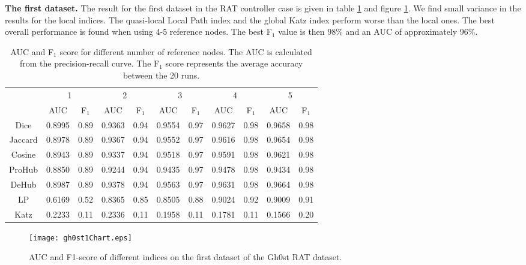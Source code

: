 \textbf{The first dataset.} The result for the first dataset in the RAT controller case is given in table \ref{aucIndex} and figure \ref{gh0stChart1}. We find small variance in the results for the local indices. The quasi-local Local Path index and the global Katz index perform worse than the local ones. The best overall performance is found when using 4-5 reference nodes. The best F$_1$ value is then 98\% and an AUC of approximately 96\%. 

\begin{table}[h!]
    \centering
    \caption{AUC and F$_1$ score for different number of reference nodes. The AUC is calculated from the precision-recall curve. The F$_1$ score represents the average accuracy between the 20 runs.}
    \begin{tabular}{|c||c|c||c|c||c|c||c|c||c|c|}
      \hline
      \multirow{2}{*}{~} 
            & \multicolumn{2}{c||}{1}
            & \multicolumn{2}{c||}{2}
            & \multicolumn{2}{c||}{3}
            & \multicolumn{2}{c||}{4}
            & \multicolumn{2}{|c|}{5} \\             \cline{2-11}
      ~     &AUC&F$_1$&AUC&F$_1$&AUC&F$_1$&AUC&F$_1$&AUC&F$_1$ \\ \hline
    Dice    &0.8995 & 0.89 & 0.9363 &0.94 &0.9554&0.97 & 0.9627 &0.98&0.9658 & 0.98 \\
    Jaccard &0.8978 & 0.89 & 0.9367 &0.94 &0.9552&0.97 & 0.9616 &0.98&0.9654 & 0.98 \\
    Cosine  &0.8943 & 0.89 & 0.9337 &0.94 &0.9518&0.97 & 0.9591 &0.98&0.9621 & 0.98 \\
    ProHub  &0.8850 & 0.89 & 0.9244 &0.94 &0.9435&0.97 & 0.9478 &0.98&0.9434 & 0.98 \\
    DeHub   &0.8987 & 0.89 & 0.9378 &0.94 &0.9563&0.97 & 0.9631 &0.98&0.9664 & 0.98 \\
    LP      &0.6169 & 0.52 & 0.8365 & 0.85 & 0.8505 & 0.88 & 0.9024 & 0.92 & 0.9009 & 0.91 \\ 
    Katz    &0.2233 & 0.11 & 0.2336 & 0.11 & 0.1958 & 0.11 & 0.1781 & 0.11 & 0.1566 & 0.20 \\ \hline
    \end{tabular}
    \label{aucIndex}
\end{table}

\begin{figure}[h!]
    \centering
    \texttt{[image: gh0st1Chart.eps]}
    \caption{AUC and F1-score of different indices on the first dataset of the Gh0st RAT dataset.}
    \label{gh0stChart1}
\end{figure}


